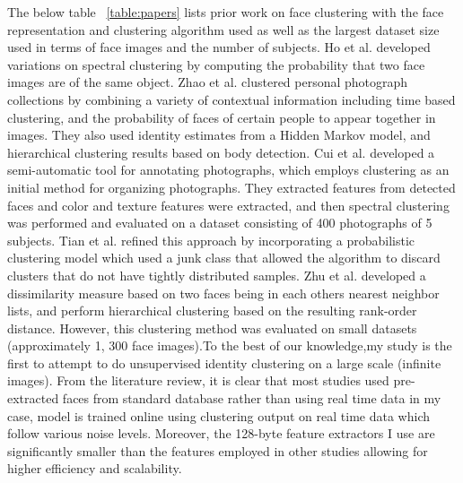 \documentclass[a4paper,12pt, twoside]{NITKReport}
\begin{document}
\par The below table ~\ref{table:papers} lists prior work on face clustering with the face representation and clustering algorithm used as well as the largest dataset size used in terms of face images and the number of subjects.  Ho et al. \cite{ho2003clustering} developed variations on spectral clustering by computing the probability that two face images are of the same object. Zhao et al. \cite{zhao2006automatic} clustered personal photograph collections by combining a variety of contextual information including time based clustering, and the probability of faces of certain people to appear together in images. They also used identity estimates from
a  Hidden  Markov  model,  and  hierarchical  clustering results based on body detection. Cui et al. \cite{cui2007easyalbum} developed a semi-automatic tool for annotating photographs,  which employs clustering as an initial method for organizing photographs. They extracted features from detected faces and color and texture features were extracted, and then spectral
clustering was performed and evaluated on a dataset consisting of 400 photographs of 5 subjects. Tian et al. \cite{tian2007face} refined this approach by incorporating a
probabilistic clustering model which used a junk class that allowed the algorithm to discard clusters that do not have tightly distributed samples.  Zhu et al. \cite{zhu2011rank} developed a dissimilarity measure based on two faces being in each others nearest neighbor lists, and perform hierarchical clustering based on the resulting rank-order distance.  However, this clustering method was evaluated on small datasets (approximately 1, 300 face images).To the best of our knowledge,my study is the first to attempt to do unsupervised identity  clustering on a large scale (infinite images). From the literature review, it is  clear that most studies used pre-extracted faces from standard database rather than using real time data in my case, model is trained online using clustering output on real time data which follow various noise levels. Moreover, the 128-byte feature extractors I use are significantly smaller than the features employed  in  other  studies  allowing  for  higher  efficiency and scalability.
\end{document}
